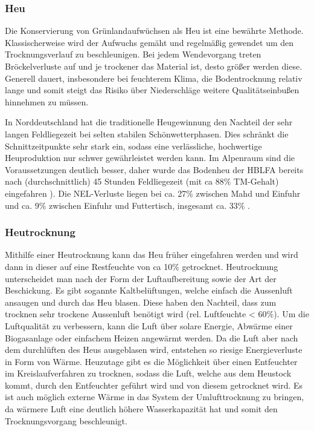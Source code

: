 \subsubsection{Heu}
\label{subsub:Heu}
Die Konservierung von Grünlandaufwüchsen als Heu ist eine bewährte Methode.
Klassischerweise wird der Aufwuchs gemäht und regelmäßig gewendet um den Trocknungsverlauf zu beschleunigen.
Bei jedem Wendevorgang treten Bröckelverluste auf und je trockener das Material ist, desto größer werden diese.
Generell dauert, insbesondere bei feuchterem Klima, die Bodentrocknung relativ lange und somit steigt das Risiko über Niederschläge weitere Qualitätseinbußen hinnehmen zu müssen.

In Norddeutschland hat die traditionelle Heugewinnung den Nachteil der sehr langen Feldliegezeit bei selten stabilen Schönwetterphasen.
Dies schränkt die Schnittzeitpunkte sehr stark ein, sodass eine verlässliche, hochwertige Heuproduktion nur schwer gewährleistet werden kann.
Im Alpenraum sind die Voraussetzungen deutlich besser, daher wurde das Bodenheu der \ac{HBLFA} bereits nach (durchschnittlich) 45 Stunden Feldliegezeit (mit ca 88\% \ac{TM}-Gehalt) eingefahren \parencite[63]{gruber2015einfluss}).
Die \ac{NEL}-Verluste liegen bei ca. 27\% zwischen Mahd und Einfuhr und ca. 9\% zwischen Einfuhr und Futtertisch, insgesamt ca. 33\% \parencite[30]{fritz2018wirtscahftliche}.

\subsubsection{Heutrocknung}
\label{subsub:Heutrocknung}
Mithilfe einer Heutrocknung kann das Heu früher eingefahren werden und wird dann in dieser auf eine Restfeuchte von ca 10\% getrocknet.
Heutrocknung unterscheidet man nach der Form der Luftaufbereitung sowie der Art der Beschickung.
Es gibt sogannte Kaltbelüftungen, welche einfach die Aussenluft ansaugen und durch das Heu blasen.
Diese haben den Nachteil, dass zum trocknen sehr trockene Aussenluft benötigt wird (rel. Luftfeuchte < 60\%).
Um die Luftqualität zu verbessern, kann die Luft über solare Energie, Abwärme einer Biogasanlage oder einfachem Heizen angewärmt werden.
Da die Luft aber nach dem durchlüften des Heus ausgeblasen wird, entstehen so riesige Energieverluste in Form von Wärme.
Heuzutage gibt es die Möglichkeit über einen Entfeuchter im Kreislaufverfahren zu trocknen, sodass die Luft, welche aus dem Heustock kommt, durch den Entfeuchter geführt wird und von diesem getrocknet wird.
Es ist auch möglich externe Wärme in das System der Umlufttrocknung zu bringen, da wärmere Luft eine deutlich höhere Wasserkapazität hat und somit den Trocknungsvorgang beschleunigt.

